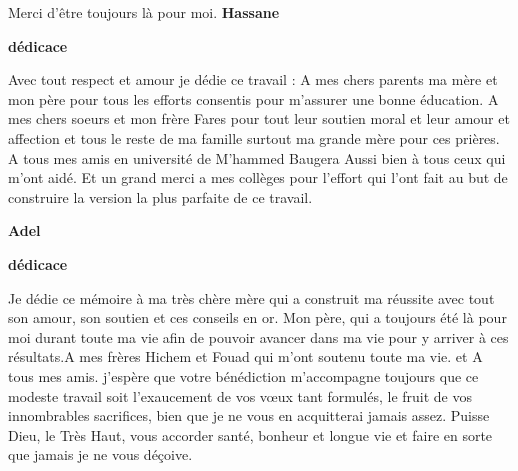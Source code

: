 \documentclass[edit,12pt,a4paper,ChapStyle,oneside,doubleinterligne]{report}
\begin{document}
\begin{flushright}
Merci d’être toujours là pour moi.
\newline
    \textbf{Hassane}
\end{flushright}
\newpage
\begin{center}
    \huge{\textbf{dédicace}}
\end{center}
\begin{large}
\phantom{hhhh}Avec tout respect et amour je dédie ce travail : A mes chers parents ma mère et mon père pour tous les efforts consentis pour m’assurer une bonne éducation.
\newline \phantom{h}\newline
\phantom{hhhh}A mes chers soeurs et mon frère Fares pour tout leur soutien moral et leur amour et affection et tous le reste de ma famille surtout ma grande mère pour ces prières.
\newline \phantom{h} \newline
\phantom{hhhh}A tous mes amis en université de M'hammed Baugera Aussi bien à tous ceux qui m’ont aidé.
\newline \newline
\phantom{hhhh}Et un grand merci a mes collèges pour l'effort qui l'ont fait au but de construire la version la plus parfaite de ce travail.
\end{large}
\newline
\newline
\begin{flushright}
    \textbf{Adel}
\end{flushright}
\newpage
\begin{center}
    \huge{\textbf{dédicace}}
\end{center}
\begin{large}
\phantom{hhhh}Je dédie ce mémoire à ma très chère mère qui a construit ma réussite avec tout son amour, son soutien et ces conseils en or. Mon père, qui a toujours été là pour moi durant toute ma vie afin de pouvoir avancer dans ma vie pour y arriver à ces résultats.A mes frères Hichem et Fouad qui m'ont soutenu toute ma vie. et A tous mes amis.
\newline
j’espère que votre bénédiction m’accompagne toujours que ce modeste travail soit l’exaucement de vos vœux tant formulés, le fruit de vos innombrables sacrifices, bien que je ne vous en acquitterai jamais assez. Puisse Dieu, le Très Haut, vous accorder santé, bonheur et longue vie et faire en sorte que jamais je ne vous déçoive. 
\newline
\newline
\end{large}
\end{document}
